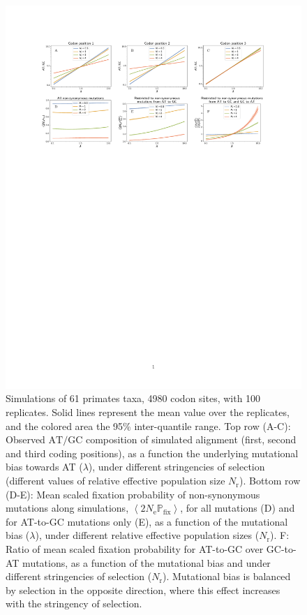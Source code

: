 \documentclass{article}
\newcommand{\Ne}{N_{\text{e}}}
\newcommand{\Ner}{N_{\text{r}}}
\newcommand{\proba}{\mathbb{P}}
\newcommand{\Pfix}{2 \Ne \proba_{\text{fix}}}
\newcommand{\atgc}{\text{AT/GC}}
\newcommand{\avgpfix}{\left\langle \Pfix \right\rangle }
\begin{document}
\begin{figure}[h]
 \centering
 \includegraphics[width=\linewidth, page=1]{figure1}
 \caption[$\atgc$ composition of the alignment]{
  Simulations of 61 primates taxa, 4980 codon sites, with 100 replicates.
  Solid lines represent the mean value over the replicates, and the colored area the 95\% inter-quantile range.
  Top row (A-C): Observed $\atgc$ composition of simulated alignment (first, second and third coding positions), as a function the underlying mutational bias towards AT ($\lambda$), under different stringencies of selection (different values of relative effective population size $\Ner$).
  Bottom row (D-E): Mean scaled fixation probability of non-synonymous mutations along simulations, $\avgpfix$, for all mutations (D) and for AT-to-GC mutations only (E), as a function of the mutational bias ($\lambda$), under different relative effective population sizes ($\Ner$).
  F: Ratio of mean scaled fixation probability for AT-to-GC over GC-to-AT mutations, as a function of the mutational bias and under different stringencies of selection ($\Ner$).
  Mutational bias is balanced by selection in the opposite direction, where this effect increases with the stringency of selection.
 }
 \label{fig:simu-mut-bias}
\end{figure}
\end{document}
